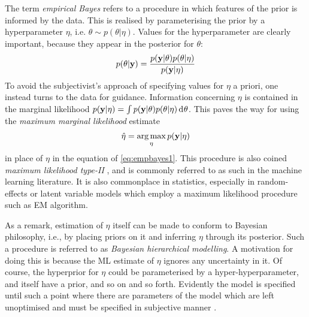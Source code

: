 The term \emph{empirical Bayes} \citep{robbins1956empirical,casella1985introduction} refers to a procedure in which features of the prior is informed by the data.
This is realised by parameterising the prior by a hyperparameter $\eta$, i.e. $\theta \sim p(\theta|\eta)$.
Values for the hyperparameter are clearly important, because they appear in the posterior for $\theta$: 
\begin{equation}\label{eq:empbayes1}
  p(\theta|{\mathbf y}) = \frac{p({\mathbf y}|\theta)p(\theta|\eta)}{p({\mathbf y}|\eta)} 
\end{equation}
To avoid the subjectivist's approach of specifying values for $\eta$ a priori, one instead turns to the data for guidance.
Information concerning $\eta$ is contained in the marginal likelihood $p({\mathbf y}|\eta) = \int p({\mathbf y}|\theta)p(\theta|\eta) \operatorname{d}\hspace{0.5pt}\! \theta$.
This paves the way for using the \emph{maximum marginal likelihood} estimate
\begin{equation}
  \hat\eta = \operatorname*{arg\,max}_\eta p({\mathbf y}|\eta) 
\end{equation}
in place of $\eta$ in the equation of \cref{eq:empbayes1}.
This procedure is also coined \emph{maximum likelihood type-II} \citep{bishop2006pattern}, and is commonly referred to as such in the machine learning literature. 
It is also commonplace in statistics, especially in random-effects or latent variable models which employ a maximum likelihood procedure such as EM algorithm.

As a remark, estimation of $\eta$ itself can be made to conform to Bayesian philosophy, i.e., by placing priors on it and inferring $\eta$ through its posterior.
Such a procedure is referred to as \emph{Bayesian hierarchical modelling}.
A motivation for doing this is because the ML estimate of $\eta$ ignores any uncertainty in it.
Of course, the hyperprior for $\eta$ could be parameterised by a hyper-hyperparameter, and itself have a prior, and so on and so forth.
Evidently the model is specified until such a point where there are parameters of the model which are left unoptimised and must be specified in subjective manner \citep{beal2003variational}.